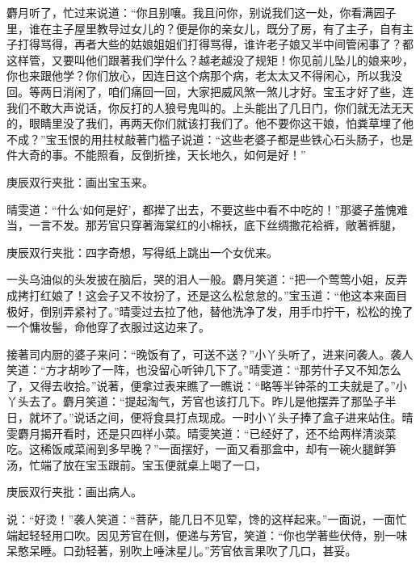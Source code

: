 \begin{parag}
麝月听了，忙过来说道：“你且别嚷。我且问你，别说我们这一处，你看满园子里，谁在主子屋里教导过女儿的？便是你的亲女儿，既分了房，有了主子，自有主子打得骂得，再者大些的姑娘姐姐们打得骂得，谁许老子娘又半中间管闲事了？都这样管，又要叫他们跟著我们学什么？越老越没了规矩！你见前儿坠儿的娘来吵，你也来跟他学？你们放心，因连日这个病那个病，老太太又不得闲心，所以我没回。等两日消闲了，咱们痛回一回，大家把威风煞一煞儿才好。宝玉才好了些，连我们不敢大声说话，你反打的人狼号鬼叫的。上头能出了几日门，你们就无法无天的，眼睛里没了我们，再两天你们就该打我们了。他不要你这干娘，怕粪草埋了他不成？”宝玉恨的用拄杖敲著门槛子说道：“这些老婆子都是些铁心石头肠子，也是件大奇的事。不能照看，反倒折挫，天长地久，如何是好！”\begin{note}庚辰双行夹批：画出宝玉来。\end{note}晴雯道：“什么‘如何是好’，都撵了出去，不要这些中看不中吃的！”那婆子羞愧难当，一言不发。那芳官只穿著海棠红的小棉袄，底下丝绸撒花袷裤，敞著裤腿，\begin{note}庚辰双行夹批：四字奇想，写得纸上跳出一个女优来。\end{note}一头乌油似的头发披在脑后，哭的泪人一般。麝月笑道：“把一个莺莺小姐，反弄成拷打红娘了！这会子又不妆扮了，还是这么松怠怠的。”宝玉道：“他这本来面目极好，倒别弄紧衬了。”晴雯过去拉了他，替他洗净了发，用手巾拧干，松松的挽了一个慵妆髻，命他穿了衣服过这边来了。
\end{parag}


\begin{parag}
    接著司内厨的婆子来问：“晚饭有了，可送不送？”小丫头听了，进来问袭人。袭人笑道：“方才胡吵了一阵，也没留心听钟几下了。”晴雯道：“那劳什子又不知怎么了，又得去收拾。”说著，便拿过表来瞧了一瞧说：“略等半钟茶的工夫就是了。”小丫头去了。麝月笑道：“提起淘气，芳官也该打几下。昨儿是他摆弄了那坠子半日，就坏了。”说话之间，便将食具打点现成。一时小丫头子捧了盒子进来站住。晴雯麝月揭开看时，还是只四样小菜。晴雯笑道：“已经好了，还不给两样清淡菜吃。这稀饭咸菜闹到多早晚？”一面摆好，一面又看那盒中，却有一碗火腿鲜笋汤，忙端了放在宝玉跟前。宝玉便就桌上喝了一口，\begin{note}庚辰双行夹批：画出病人。\end{note}说：“好烫！”袭人笑道：“菩萨，能几日不见荤，馋的这样起来。”一面说，一面忙端起轻轻用口吹。因见芳官在侧，便递与芳官，笑道：“你也学著些伏侍，别一味呆憨呆睡。口劲轻著，别吹上唾沫星儿。”芳官依言果吹了几口，甚妥。
\end{parag}



